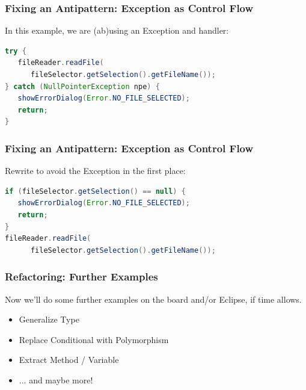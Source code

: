 \begin{frame}[fragile]
\frametitle{Fixing an Antipattern: Exception as Control Flow}
\begin{changemargin}{1cm}

In this example, we are (ab)using an Exception and handler:

\begin{lstlisting}[language={Java}]
try {
   fileReader.readFile(
      fileSelector.getSelection().getFileName());
} catch (NullPointerException npe) {
   showErrorDialog(Error.NO_FILE_SELECTED);
   return;
}
\end{lstlisting} 
\end{changemargin}
\end{frame}

\begin{frame}[fragile]
\frametitle{Fixing an Antipattern: Exception as Control Flow}
\begin{changemargin}{1cm}

Rewrite to avoid the Exception in the first place:

\begin{lstlisting}[language={Java}]
if (fileSelector.getSelection() == null) {
   showErrorDialog(Error.NO_FILE_SELECTED);
   return;
}
fileReader.readFile(
      fileSelector.getSelection().getFileName());
\end{lstlisting} 
\end{changemargin}
\end{frame}

\begin{frame}
\frametitle{Refactoring: Further Examples}
\begin{changemargin}{1cm}

Now we'll do some further examples on the board and/or Eclipse, if time allows.

\begin{itemize}
	\item Generalize Type
	\item Replace Conditional with Polymorphism
	\item Extract Method / Variable
	\item ... and maybe more!
\end{itemize}

\end{changemargin}
\end{frame}




